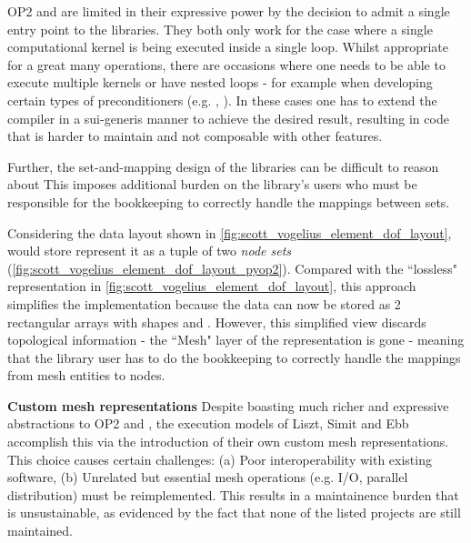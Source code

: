 \documentclass[thesis]{subfiles}
\begin{document}
OP2 and  are limited in their expressive power by the decision to admit a single entry point to the libraries.
They both only work for the case where a single computational kernel is being executed inside a single loop.
Whilst appropriate for a great many operations, there are occasions where one needs to be able to execute multiple kernels or have nested loops - for example when developing certain types of preconditioners (e.g. \cite{gibsonSlateExtendingFiredrake2020}, \cite{farrellPCPATCHSoftwareTopological2021}).
In these cases one has to extend the compiler in a sui-generis manner to achieve the desired result, resulting in code that is harder to maintain and not composable with other features.

Further, the set-and-mapping design of the libraries can be difficult to reason about
This imposes additional burden on the library's users who must be responsible for the bookkeeping to correctly handle the mappings between sets.

Considering the data layout shown in \cref{fig:scott_vogelius_element_dof_layout},  would store represent it as a tuple of two \textit{node sets} (\cref{fig:scott_vogelius_element_dof_layout_pyop2}).
Compared with the ``lossless" representation in \cref{fig:scott_vogelius_element_dof_layout}, this approach simplifies the implementation because the data can now be stored as 2 rectangular arrays with shapes  and .
However, this simplified view discards topological information - the ``Mesh" layer of the representation is gone - meaning that the library user has to do the bookkeeping to correctly handle the mappings from mesh entities to nodes.

    \textbf{Custom mesh representations}
    Despite boasting much richer and expressive abstractions to OP2 and , the execution models of Liszt, Simit and Ebb accomplish this via the introduction of their own custom mesh representations.
    This choice causes certain challenges:
    (a) Poor interoperability with existing software,
    (b) Unrelated but essential mesh operations (e.g. I/O, parallel distribution) must be reimplemented. This results in a maintainence burden that is unsustainable, as evidenced by the fact that none of the listed projects are still maintained.
\end{document}
